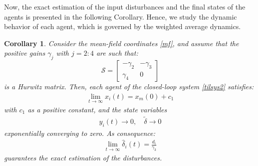 \documentclass[journal,twoside]{IEEEtran}
\newtheorem{corollary}{Corollary}
\begin{document}
Now, the exact estimation of the input disturbances and the final states of the agents is presented in the following Corollary. Hence, we study the dynamic behavior of each agent, which is governed by the weighted average dynamics. 

\begin{corollary} \em
\label{cor1}
Consider the  mean-field coordinates \eqref{mf}, and assume that the positive gains  $\gamma_j$ with $j=2:4$ are such that: 
\begin{equation}
\label{matS}
{\mathcal S}=  \left[ \begin{array}{cc}      -\gamma_2  & -\gamma_3  \\ 
\gamma_4 & 0
\end{array} \right]
\nonumber
\end{equation}
 is a Hurwitz matrix. Then, each agent of the closed-loop system \eqref{tilsys2} satisfies:
\begin{align}
\lim_{t \to \infty}  x_{i}(t)  = x_{m}(0) +c_1
\end{align}
with $c_1$ as a positive constant, and the state variables
\begin{align}
\label{xd2}
y_{i} (t) \to 0, \quad  \tilde \delta  \to 0
\end{align}
exponentially converging to zero. As consequence:
\begin{align}
\lim_{t \to \infty} \hat \delta_i (t)= \frac{d_i}{\gamma_3}
\end{align}
guarantees the exact estimation of the disturbances.
\end{corollary}
 
\end{document}
